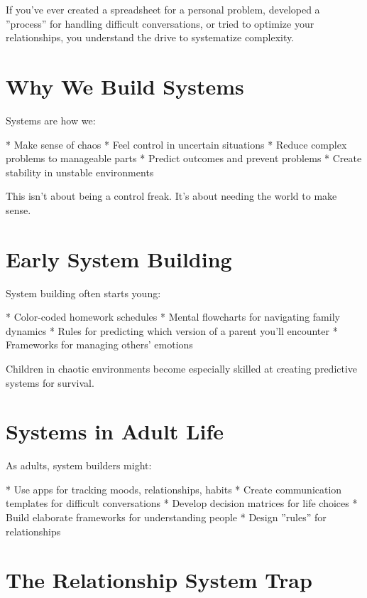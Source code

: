 \documentclass[12pt,oneside]{book}
\begin{document}
If you've ever created a spreadsheet for a personal problem, developed a ''process'' for handling difficult conversations, or tried to optimize your relationships, you understand the drive to systematize complexity.

\section{Why We Build Systems}

Systems are how we:

                    * Make sense of chaos
                    * Feel control in uncertain situations
                    * Reduce complex problems to manageable parts
                    * Predict outcomes and prevent problems
                    * Create stability in unstable environments

This isn't about being a control freak. It's about needing the world to make sense.

\section{Early System Building}

System building often starts young:

                    * Color-coded homework schedules
                    * Mental flowcharts for navigating family dynamics
                    * Rules for predicting which version of a parent you'll encounter
                    * Frameworks for managing others' emotions

Children in chaotic environments become especially skilled at creating predictive systems for survival.

\section{Systems in Adult Life}

As adults, system builders might:

                    * Use apps for tracking moods, relationships, habits
                    * Create communication templates for difficult conversations
                    * Develop decision matrices for life choices
                    * Build elaborate frameworks for understanding people
                    * Design ''rules'' for relationships

\section{The Relationship System Trap}
\end{document}
